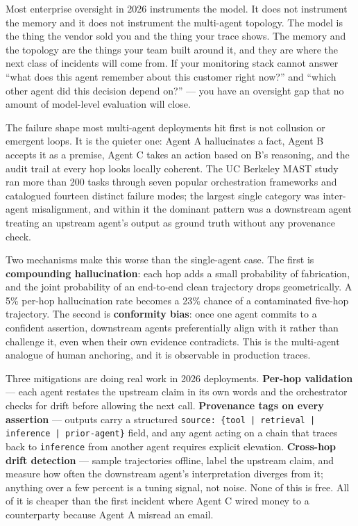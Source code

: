 \begin{TNwarning} Most enterprise oversight in 2026 instruments the model. It does not instrument the memory and it does not instrument the multi-agent topology. The model is the thing the vendor sold you and the thing your trace shows. The memory and the topology are the things your team built around it, and they are where the next class of incidents will come from. If your monitoring stack cannot answer ``what does this agent remember about this customer right now?'' and ``which other agent did this decision depend on?'' --- you have an oversight gap that no amount of model-level evaluation will close. \end{TNwarning}

The failure shape most multi-agent deployments hit first is not collusion or emergent loops. It is the quieter one: Agent A hallucinates a fact, Agent B accepts it as a premise, Agent C takes an action based on B's reasoning, and the audit trail at every hop looks locally coherent. The UC Berkeley MAST study \citep{cemri2025mast} ran more than 200 tasks through seven popular orchestration frameworks and catalogued fourteen distinct failure modes; the largest single category was inter-agent misalignment, and within it the dominant pattern was a downstream agent treating an upstream agent's output as ground truth without any provenance check.

Two mechanisms make this worse than the single-agent case. The first is \textbf{compounding hallucination}: each hop adds a small probability of fabrication, and the joint probability of an end-to-end clean trajectory drops geometrically. A 5\% per-hop hallucination rate becomes a 23\% chance of a contaminated five-hop trajectory. The second is \textbf{conformity bias}: once one agent commits to a confident assertion, downstream agents preferentially align with it rather than challenge it, even when their own evidence contradicts. This is the multi-agent analogue of human anchoring, and it is observable in production traces.

Three mitigations are doing real work in 2026 deployments. \textbf{Per-hop validation} --- each agent restates the upstream claim in its own words and the orchestrator checks for drift before allowing the next call. \textbf{Provenance tags on every assertion} --- outputs carry a structured \texttt{source: \{tool | retrieval | inference | prior-agent\}} field, and any agent acting on a chain that traces back to \texttt{inference} from another agent requires explicit elevation. \textbf{Cross-hop drift detection} --- sample trajectories offline, label the upstream claim, and measure how often the downstream agent's interpretation diverges from it; anything over a few percent is a tuning signal, not noise. None of this is free. All of it is cheaper than the first incident where Agent C wired money to a counterparty because Agent A misread an email.

